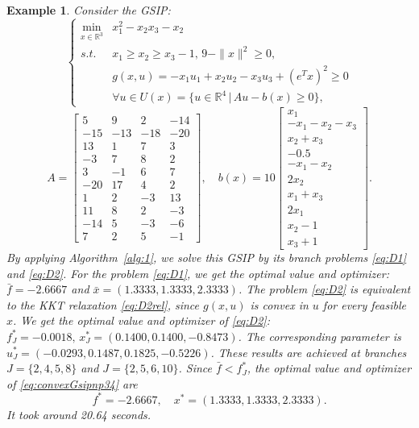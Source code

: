 \documentclass{amsart}
\theoremstyle{plain}
\newtheorem{exmp}[theorem]{Example}
\newcommand{\re}{\mathbb{R}}
\newcommand{\st}{\mathit{s.t.}}
\numberwithin{equation}{section}
\begin{document}
		
		\begin{exmp}\label{ex:convexGSIPnp34} 
			Consider the GSIP:
			\begin{equation}\label{eq:convexGsipnp34}
				\left\{
				\begin{array}{cl}
					\min\limits_{x\in\re^3} & x^2_1-x_2x_3-x_2\\
					\st &  x_1\ge x_2\ge x_3-1,\, 9-\|x\|^2\ge 0,\\
					& g(x,u) = -x_1u_1+x_2u_2-x_3u_3+(e^Tx)^2\geq 0\\
					& \forall u\in U(x) = \{u\in\re^4\,\vert\, Au-b(x)\ge 0\},		
				\end{array}
				\right.
			\end{equation}
			\[
			A = \left[\begin{array}{rrrr}
				5 & 9 & 2 & -14 \\
				-15 & -13 & -18 & -20 \\
				13 & 1 & 7 & 3 \\
				-3 & 7 & 8 & 2 \\
				3 & -1 & 6 & 7 \\
				-20 & 17 & 4 & 2 \\
				1 & 2 & -3 & 13 \\
				11 & 8 & 2 & -3 \\
				-14 & 5 & -3 & -6 \\
				7 & 2 & 5 & -1
			\end{array}\right],\quad
			b(x) = 
			10\begin{bmatrix}
				x_1 \\
				-x_1 - x_2 - x_3 \\
				x_2 + x_3 \\
				-0.5 \\
				-x_1 - x_2 \\
				2x_2 \\
				x_1 + x_3 \\
				2x_1 \\
				x_2 - 1 \\
				x_3 + 1
			\end{bmatrix}.
			\]
			By applying Algorithm~\ref{alg:1}, we solve this GSIP by its branch problems \eqref{eq:D1} and \eqref{eq:D2}.
			For the problem \eqref{eq:D1}, we get the optimal value and optimizer:
			$\bar{f} = -2.6667$ and $\bar{x} = (1.3333, 1.3333, 2.3333)$.
			The problem \eqref{eq:D2} is equivalent to the KKT relaxation \eqref{eq:D2rel},
			since $g(x,u)$ is convex in $u$ for every feasible $x$.
			We get the optimal value and optimizer of \eqref{eq:D2}:
			$f_J^* = -0.0018,\,x_J^* = (0.1400, 0.1400, -0.8473)$.
			The corresponding parameter is $u_J^* = (-0.0293, 0.1487, 0.1825, -0.5226)$.
			These results are achieved at branches $J = \{2,4,5,8\}$ and $J = \{2,5,6,10\}$.
			Since $\bar{f}<f_J^*$, the optimal value and optimizer
			of \eqref{eq:convexGsipnp34} are
			\[
			f^* = -2.6667,\quad x^* = (1.3333, 1.3333, 2.3333).
			\]		
			It took around 20.64 seconds.
			\end{exmp}
		
\end{document}
